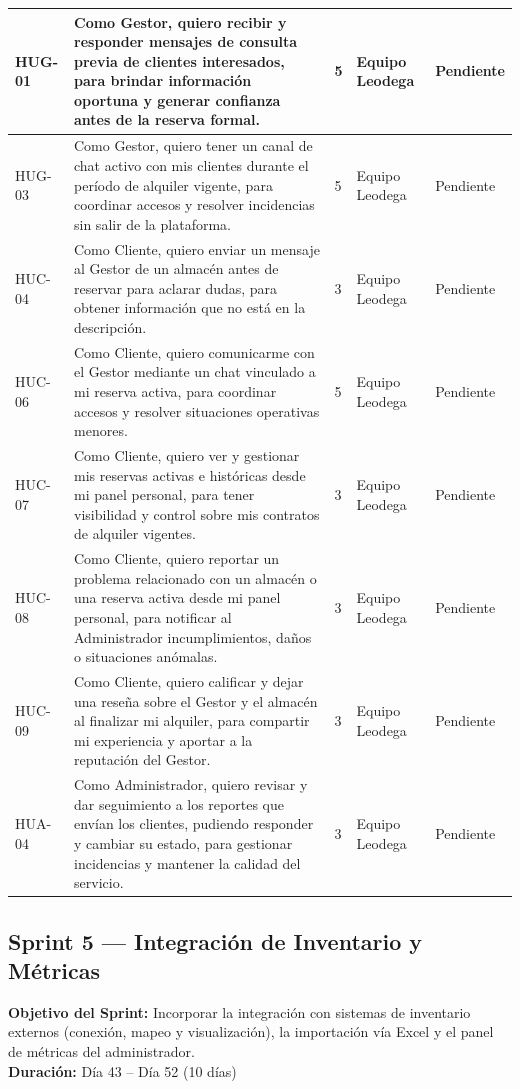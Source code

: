 {\begin{longtable}{|M{1.6cm}|L{7.0cm}|M{1.4cm}|M{2.4cm}|M{1.8cm}|}
HUG-01 & Como Gestor, quiero recibir y responder mensajes de consulta previa de clientes interesados, para brindar información oportuna y generar confianza antes de la reserva formal. & 5 & Equipo Leodega & Pendiente \\ \hline
HUG-03 & Como Gestor, quiero tener un canal de chat activo con mis clientes durante el período de alquiler vigente, para coordinar accesos y resolver incidencias sin salir de la plataforma. & 5 & Equipo Leodega & Pendiente \\ \hline
HUC-04 & Como Cliente, quiero enviar un mensaje al Gestor de un almacén antes de reservar para aclarar dudas, para obtener información que no está en la descripción. & 3 & Equipo Leodega & Pendiente \\ \hline
HUC-06 & Como Cliente, quiero comunicarme con el Gestor mediante un chat vinculado a mi reserva activa, para coordinar accesos y resolver situaciones operativas menores. & 5 & Equipo Leodega & Pendiente \\ \hline
HUC-07 & Como Cliente, quiero ver y gestionar mis reservas activas e históricas desde mi panel personal, para tener visibilidad y control sobre mis contratos de alquiler vigentes. & 3 & Equipo Leodega & Pendiente \\ \hline
HUC-08 & Como Cliente, quiero reportar un problema relacionado con un almacén o una reserva activa desde mi panel personal, para notificar al Administrador incumplimientos, daños o situaciones anómalas. & 3 & Equipo Leodega & Pendiente \\ \hline
HUC-09 & Como Cliente, quiero calificar y dejar una reseña sobre el Gestor y el almacén al finalizar mi alquiler, para compartir mi experiencia y aportar a la reputación del Gestor. & 3 & Equipo Leodega & Pendiente \\ \hline
HUA-04 & Como Administrador, quiero revisar y dar seguimiento a los reportes que envían los clientes, pudiendo responder y cambiar su estado, para gestionar incidencias y mantener la calidad del servicio. & 3 & Equipo Leodega & Pendiente \\ \hline
\end{longtable}
}
\clearpage

\subsection{Sprint 5 --- Integración de Inventario y Métricas}
\textbf{Objetivo del Sprint:} Incorporar la integración con sistemas de inventario externos (conexión, mapeo y visualización), la importación vía Excel y el panel de métricas del administrador.\\
\textbf{Duración:} Día 43 -- Día 52 (10 días)

